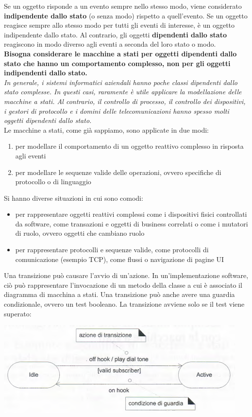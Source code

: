 \documentclass[a4paper,12pt, oneside]{book}
\begin{document}
Se un oggetto risponde a un evento sempre nello stesso modo, viene considerato \textbf{indipendente dallo stato} (o senza modo) rispetto a quell'evento. Se un oggetto reagisce sempre allo
stesso modo per tutti gli eventi di interesse, è un oggetto indipendente dallo stato. Al contrario, gli oggetti \textbf{dipendenti dallo stato} reagiscono in modo diverso agli eventi a seconda del loro stato o modo.\\
\textbf{Bisogna considerare le macchine a stati per oggetti dipendenti dallo stato che hanno un comportamento complesso, non per gli oggetti indipendenti dallo stato.}\\
\textit{In generale, i sistemi informatici aziendali hanno poche classi dipendenti dallo stato complesse. In questi casi, raramente è utile applicare la modellazione delle macchine a stati. Al contrario, il controllo di processo, il controllo dei dispositivi, i gestori di protocollo e i domini delle telecomunicazioni hanno spesso molti oggetti dipendenti dallo stato.}\\
Le macchine a stati, come già sappiamo, sono applicate in due modi:
\begin{enumerate}
	\item per modellare il comportamento di un oggetto reattivo complesso in risposta agli eventi
	\item per modellare le sequenze valide delle operazioni, ovvero specifiche di protocollo o di linguaggio
\end{enumerate}
Si hanno diverse situazioni in cui sono comodi:
\begin{itemize}
	\item per rappresentare oggetti reattivi complessi come i dispositivi fisici controllati da software, come transazioni e oggetti di business correlati o come i mutatori di ruolo, ovvero oggetti che cambiano ruolo
	\item per rappresentare protocolli e sequenze valide, come protocolli di comunicazione (esempio TCP), come flussi o navigazione di pagine UI
\end{itemize}
Una transizione può causare l'avvio di un'azione. In un'implementazione software, ciò può rappresentare l'invocazione di un metodo della classe a cui è associato il diagramma di macchina a stati. Una transizione può anche avere una guardia condizionale, ovvero un test booleano. La transizione avviene solo se il test viene superato:
\begin{center}
	\includegraphics[scale=0.6]{img/statd2.png}
\end{center}
\end{document}

